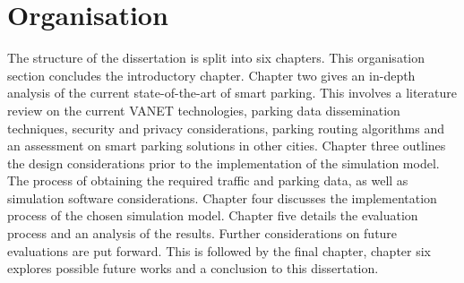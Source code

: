 \section{Organisation}
The structure of the dissertation is split into six chapters. This organisation section concludes the introductory chapter. Chapter two gives an in-depth analysis of the current state-of-the-art of smart parking. This involves a literature review on the current \ac{VANET} technologies, parking data dissemination techniques, security and privacy considerations, parking routing algorithms and 
an assessment on smart parking solutions in other cities. Chapter three outlines the design considerations prior to the implementation of the simulation model. The process of obtaining the required traffic and parking data, as well as simulation software considerations. Chapter four discusses the implementation process of the chosen simulation model. Chapter five details the evaluation process and an analysis of the results. Further considerations on future evaluations are put forward. This is followed by the final chapter, chapter six explores possible future works and a conclusion to this dissertation.